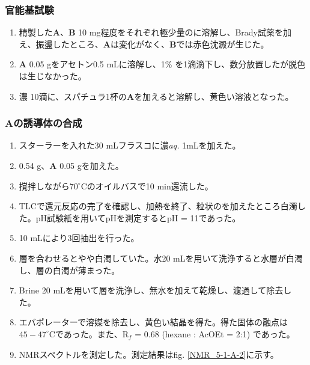 \documentclass{ltjsarticle}
\theoremstyle{definition}
\numberwithin{equation}{section}
\newcommand{\D}{^\circ\text{C}}
\begin{document}
\subsubsection{官能基試験}
\begin{enumerate}
\item 精製した\textbf{A}、\textbf{B} 10 mg程度をそれぞれ極少量のに溶解し、Brady試薬を加え、振盪したところ、\textbf{A}は変化がなく、\textbf{B}では赤色沈澱が生じた。
\item \textbf{A} 0.05 gをアセトン0.5 mLに溶解し、1\%  を1滴滴下し、数分放置したが脱色は生じなかった。
\item 濃 10滴に、スパチュラ1杯の\textbf{A}を加えると溶解し、黄色い溶液となった。
\end{enumerate}

\subsubsection{\textbf{A}の誘導体の合成}
\begin{enumerate}
\item スターラーを入れた30 mLフラスコに濃\textit{aq.} 1mLを加えた。
\item {} 0.54 g、\textbf{A} 0.05 gを加えた。
\item 撹拌しながら$70\D$のオイルバスで10 min還流した。
\item TLCで還元反応の完了を確認し、加熱を終了、粒状のを加えたところ白濁した。pH試験紙を用いてpHを測定するとpH = 11であった。
\item {} 10 mLにより3回抽出を行った。
\item {}層を合わせるとやや白濁していた。水20 mLを用いて洗浄すると水層が白濁し、層の白濁が薄まった。
\item Brine 20 mLを用いて層を洗浄し、無水を加えて乾燥し、濾過して除去した。
\item エバポレーターで溶媒を除去し、黄色い結晶を得た。得た固体の融点は$45 - 47\D$であった。また、R$_f$ = 0.68 (hexane : AcOEt = 2:1) であった。
\item {} NMRスペクトルを測定した。測定結果はfig. \ref{NMR_5-1-A-2}に示す。
\end{enumerate}
\end{document}
